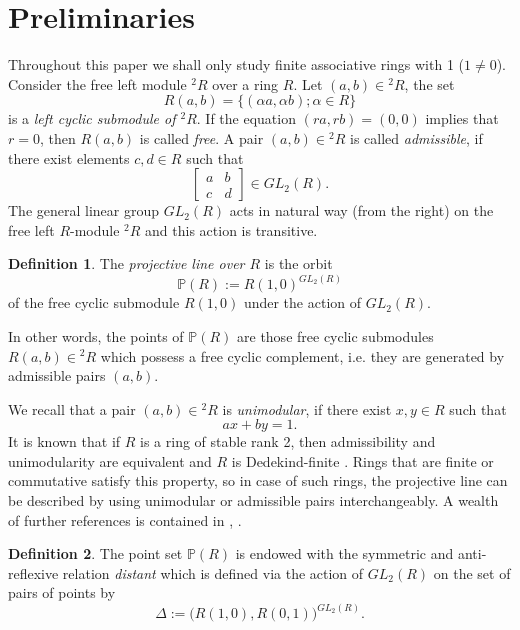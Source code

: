 \documentclass[12pt,a4paper]{article}
\theoremstyle{definition}
\newtheorem{defn}{Definition}
\begin{document}
\section{Preliminaries}
Throughout this paper we shall only study finite associative rings with 1 ($1\neq 0$). Consider the free left module  $^2R$ over a ring $R$. Let  $(a, b)\in {^2R}$, the set $$R(a, b)=\{(\alpha a, \alpha b); \alpha \in R\}$$ is a {\sl left cyclic submodule of ${^2R}$}. If the equation $(ra, rb)=(0, 0)$ implies that $r=0$, then $R(a, b)$ is called {\sl free}. A pair $(a, b)\in {^2R}$ is called {\sl admissible}, if there exist elements $c, d \in R$ such that $$\left[\begin{array}{cclr}
a&b\\ c&d
\end{array}\right] \in GL_2(R).$$ 
The general linear group $GL_2(R)$ acts in natural way (from the right) on the free left $R$-module $^2R$ and this action is transitive.%
\begin{defn}\label{p.line}{\rm \cite{hav1}}
The {\sl projective line over $R$} is the orbit $$\mathbb{P}(R):=R(1, 0)^{GL_2(R)}$$ of the free cyclic submodule $R(1, 0)$ under the action of $GL_2(R)$.
\end{defn}
In other words, the points of $\mathbb{P}(R)$ are those free cyclic submodules $R(a, b)\in {^2R}$  which possess a free cyclic complement, i.e. they are generated by admissible pairs $(a, b)$.

We recall that a pair $(a, b)\in {^2R}$ is {\sl unimodular}, if there exist $x, y\in R$ such that $$ax+by=1.$$
It is known that if $R$ is a ring of stable rank 2, then admissibility and unimodularity are equivalent and $R$ is Dedekind-finite \cite[Remark 2.4]{hav1}. Rings that are finite or commutative satisfy this property, so in case of such rings, the projective line can be described by using unimodular or admissible pairs interchangeably.\newline
A wealth of further references is contained in \cite{chain.g}, \cite{kettengeom}.

\begin{defn}\label{distant}{\rm\cite{radical}}
The point set $\mathbb{P}(R)$ is endowed with the symmetric and anti-reflexive relation {\sl distant} which is defined via the action of $GL_2(R)$ on the set of pairs of points by 
$$\Delta:=\bigl(R(1, 0), R(0, 1)\bigr)^{GL_2(R)}.$$\end{defn}
\end{document}
